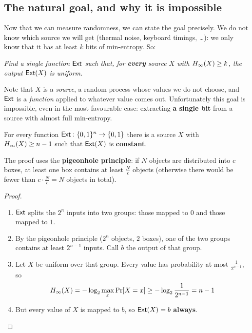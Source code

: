 \subsection{The natural goal, and why it is impossible}

Now that we can measure randomness, we can state the goal precisely. We do not know which source we will get (thermal noise, keyboard timings, \ldots): we only know that it has at least $k$ bits of min-entropy. So:

\begin{center}
  \itshape Find a single function $\mathsf{Ext}$ such that, for \textbf{every} source $X$ with $H_\infty(X) \geq k$, the output $\mathsf{Ext}(X)$ is uniform.
\end{center}

Note that $X$ is a \textit{source}, a random process whose values we do not choose, and $\mathsf{Ext}$ is a \textit{function} applied to whatever value comes out. Unfortunately this goal is impossible, even in the most favourable case: extracting \textbf{a single bit} from a source with almost full min-entropy.

\begin{framedprop}[label={prop:no-deterministic}]{}
  For every function $\mathsf{Ext} : \{0,1\}^n \to \{0,1\}$ there is a source $X$ with $H_\infty(X) \geq n-1$ such that $\mathsf{Ext}(X)$ is \textbf{constant}.
\end{framedprop}

The proof uses the \textbf{pigeonhole principle}: if $N$ objects are distributed into $c$ boxes, at least one box contains at least $\frac{N}{c}$ objects (otherwise there would be fewer than $c \cdot \frac{N}{c} = N$ objects in total).

\begin{proof}
  \begin{enumerate}
    \item $\mathsf{Ext}$ splits the $2^n$ inputs into two groups: those mapped to $0$ and those mapped to $1$.
    \item By the pigeonhole principle ($2^n$ objects, $2$ boxes), one of the two groups contains at least $2^{n-1}$ inputs. Call $b$ the output of that group.
    \item Let $X$ be uniform over that group. Every value has probability at most $\frac{1}{2^{n-1}}$, so
    \[
      H_\infty(X) = -\log_2 \max_x \Pr[X = x] \geq -\log_2 \frac{1}{2^{n-1}} = n - 1
    \]
    \item But every value of $X$ is mapped to $b$, so $\mathsf{Ext}(X) = b$ \textbf{always}. \qedhere
  \end{enumerate}
\end{proof}

